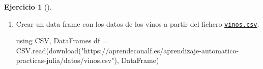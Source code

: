 \documentclass[
  a4paper,
]{scrreport}
\newenvironment{Shaded}{\begin{snugshade}}{\end{snugshade}}
\newcommand{\BuiltInTok}[1]{\textcolor[rgb]{0.00,0.23,0.31}{#1}}
\newcommand{\FunctionTok}[1]{\textcolor[rgb]{0.28,0.35,0.67}{#1}}
\newcommand{\ImportTok}[1]{\textcolor[rgb]{0.00,0.46,0.62}{#1}}
\newcommand{\NormalTok}[1]{\textcolor[rgb]{0.00,0.23,0.31}{#1}}
\newcommand{\OperatorTok}[1]{\textcolor[rgb]{0.37,0.37,0.37}{#1}}
\newcommand{\StringTok}[1]{\textcolor[rgb]{0.13,0.47,0.30}{#1}}
\theoremstyle{definition}
\newtheorem{exercise}{Ejercicio}[chapter]
\theoremstyle{remark}
\begin{document}
\begin{exercise}[]
\begin{enumerate}
\def\labelenumi{\alph{enumi}.}
\item
  Crear un data frame con los datos de los vinos a partir del fichero
  \href{https://aprendeconalf.es/aprendizaje-automatico-practicas-julia/datos/vinos.csv}{\texttt{vinos.csv}}.

  \begin{tcolorbox}[enhanced jigsaw, left=2mm, colback=white, coltitle=black, opacitybacktitle=0.6, titlerule=0mm, breakable, bottomrule=.15mm, toptitle=1mm, bottomtitle=1mm, colbacktitle=quarto-callout-tip-color!10!white, opacityback=0, rightrule=.15mm, title=\textcolor{quarto-callout-tip-color}{\faLightbulb}\hspace{0.5em}{Solución}, colframe=quarto-callout-tip-color-frame, arc=.35mm, leftrule=.75mm, toprule=.15mm]

\begin{Shaded}
\begin{Highlighting}[]
\ImportTok{using} \BuiltInTok{CSV}\NormalTok{, }\BuiltInTok{DataFrames}
\NormalTok{df }\OperatorTok{=}\NormalTok{ CSV.}\FunctionTok{read}\NormalTok{(}\FunctionTok{download}\NormalTok{(}\StringTok{"https://aprendeconalf.es/aprendizaje{-}automatico{-}practicas{-}julia/datos/vinos.csv"}\NormalTok{), DataFrame)}
\end{Highlighting}
\end{Shaded}


\end{tcolorbox}
\end{enumerate}
\end{exercise}
\end{document}

